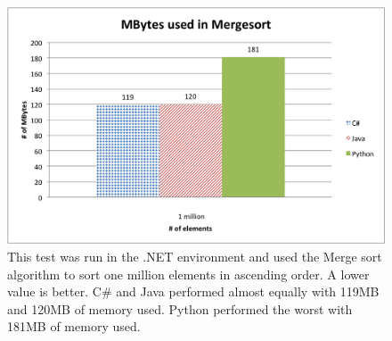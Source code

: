 \begin{figure}[h]
	\centering
	\includegraphics[width=1.0\linewidth]{chapters/new_media/MBytesMergesort.png}
	\caption{This test was run in the .NET environment and used the Merge sort algorithm to sort one million elements in ascending order. A lower value is better. C\# and Java performed almost equally with 119MB and 120MB of memory used. Python performed the worst with 181MB of memory used. }
	\label{fig:net_merge_sort_memory}
\end{figure}
